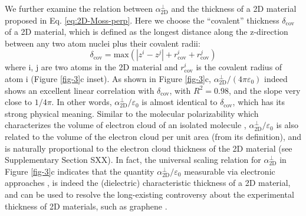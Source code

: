 \documentclass[journal=ancac3,manuscript=article,email=true,hyperref=true,keywords=false]{achemso}
\begin{document}
We further examine the relation between $\alpha_{\mathrm{2D}}^{\perp}$ and the
thickness of a 2D material proposed in
Eq. \ref{eq:2D-Moss-perp}. Here we choose the ``covalent'' thickness
$\delta_{\mathrm{cov}}$ of a 2D material, which is defined as the
longest distance along the z-direction between any two atom nuclei
plus their covalent radii:
\begin{equation}
  \label{eq:cov-thick}
  \delta_{\mathrm{cov}} = \mathrm{max}(|z^{i} - z^{j}|
  + r^{i}_{\mathrm{cov}} + r^{j}_{\mathrm{cov}})
\end{equation}
where i, j are two atoms in the 2D material and $r_{\mathrm{cov}}^{i}$
is the covalent radius of atom i (Figure \ref{fig-3}c inset). As shown
in Figure \ref{fig-3}c,
$\alpha_{\mathrm{2D}}^{\perp}/(4 \pi \varepsilon_{0})$ indeed shows an
excellent linear correlation with $\delta_{\mathrm{cov}}$, with
$R^{2}=0.98$, and the slope very close to $1/4\pi$. In other words,
$\alpha_{\mathrm{2D}}^{\perp} / \varepsilon_{0}$ is almost identical
to $\delta_{\mathrm{cov}}$, which has its strong physical
meaning. Similar to the molecular polarizability which characterizes
the volume of electron cloud of an isolated molecule
\cite{Israelachvili_2011},
$\alpha_{\mathrm{2D}}^{\perp}/\varepsilon_{0}$ is also related to the
volume of the electron cloud per unit area (from its definition), and
is naturally proportional to the electron cloud thickness of the 2D
material (see Supplementary Section SXX). In fact, the universal
scaling relation for $\alpha_{\mathrm{2D}}^{\perp}$ in Figure \ref{fig-3}c indicates
that the quantity $\alpha_{\mathrm{2D}}^{\perp}/\varepsilon_{0}$ measurable via
electronic approaches
\cite{Antoine_1999,Cherniavskaya_2003,Krauss_1999_EFM}, is indeed the
(dielectric) characteristic thickness of a 2D material, and can be
used to resolve the long-existing controversy about the experimental
thickness of 2D materials, such as graphene \cite{Shearer_2016}.

\iffalse
The universal relations for $\alpha_{\mathrm{2D}}^{\parallel}$ and
$\alpha_{\mathrm{2D}}^{\perp}$ revealed by Eqs. \ref{eq:2D-Moss-para}
and \ref{eq:2D-Moss-perp} are not coincidence. Combining recent
theoretical findings of the linear relation between exciton binding
energy $E_{\mathrm{b}}$ and $E_{\mathrm{g}}$ of 2D materials
\cite{Choi_linear_2015,Olsen_2016_hydrogen,Jiang_2017_Eg_Eb}, and the
fact that the $E_{\mathrm{b}}$ is roughly inversely proportional to
$\alpha_{\mathrm{2D}}^{\parallel}$ \cite{Pulci_2014}, it is reasonable to have a
general Moss-like relation between $E_{\mathrm{g}}$ and
$1/\alpha_{\mathrm{2D}}^{\parallel}$. Moreover, the bandgap-independent relation of
2D $\alpha_{\mathrm{2D}}^{\perp}$ resembles molecular polarizabilities of conjugate
molecules \cite{Davies_1952}, fullerenes \cite{Sabirov_2014} and
carbon nanotubes \cite{Benedict_1995}, which are also shown to be
geometry-dependent.
\fi
\end{document}
